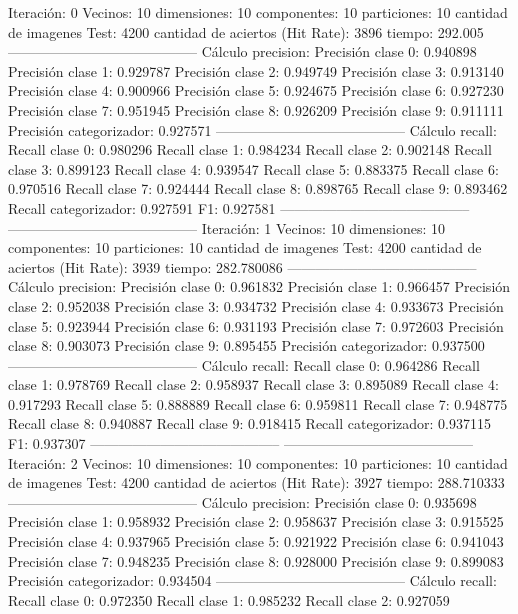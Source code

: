 Iteración: 0
Vecinos: 10
dimensiones: 10
componentes: 10
particiones: 10
cantidad de imagenes Test: 4200
cantidad de aciertos (Hit Rate): 3896
tiempo: 292.005
-----------------------------------------
Cálculo precision: 
Precisión clase 0: 0.940898
Precisión clase 1: 0.929787
Precisión clase 2: 0.949749
Precisión clase 3: 0.913140
Precisión clase 4: 0.900966
Precisión clase 5: 0.924675
Precisión clase 6: 0.927230
Precisión clase 7: 0.951945
Precisión clase 8: 0.926209
Precisión clase 9: 0.911111
Precisión categorizador: 0.927571
-----------------------------------------
Cálculo recall: 
Recall clase 0: 0.980296
Recall clase 1: 0.984234
Recall clase 2: 0.902148
Recall clase 3: 0.899123
Recall clase 4: 0.939547
Recall clase 5: 0.883375
Recall clase 6: 0.970516
Recall clase 7: 0.924444
Recall clase 8: 0.898765
Recall clase 9: 0.893462
Recall categorizador: 0.927591
F1: 0.927581
-----------------------------------------
-----------------------------------------
Iteración: 1
Vecinos: 10
dimensiones: 10
componentes: 10
particiones: 10
cantidad de imagenes Test: 4200
cantidad de aciertos (Hit Rate): 3939
tiempo: 282.780086
-----------------------------------------
Cálculo precision: 
Precisión clase 0: 0.961832
Precisión clase 1: 0.966457
Precisión clase 2: 0.952038
Precisión clase 3: 0.934732
Precisión clase 4: 0.933673
Precisión clase 5: 0.923944
Precisión clase 6: 0.931193
Precisión clase 7: 0.972603
Precisión clase 8: 0.903073
Precisión clase 9: 0.895455
Precisión categorizador: 0.937500
-----------------------------------------
Cálculo recall: 
Recall clase 0: 0.964286
Recall clase 1: 0.978769
Recall clase 2: 0.958937
Recall clase 3: 0.895089
Recall clase 4: 0.917293
Recall clase 5: 0.888889
Recall clase 6: 0.959811
Recall clase 7: 0.948775
Recall clase 8: 0.940887
Recall clase 9: 0.918415
Recall categorizador: 0.937115
F1: 0.937307
-----------------------------------------
-----------------------------------------
Iteración: 2
Vecinos: 10
dimensiones: 10
componentes: 10
particiones: 10
cantidad de imagenes Test: 4200
cantidad de aciertos (Hit Rate): 3927
tiempo: 288.710333
-----------------------------------------
Cálculo precision: 
Precisión clase 0: 0.935698
Precisión clase 1: 0.958932
Precisión clase 2: 0.958637
Precisión clase 3: 0.915525
Precisión clase 4: 0.937965
Precisión clase 5: 0.921922
Precisión clase 6: 0.941043
Precisión clase 7: 0.948235
Precisión clase 8: 0.928000
Precisión clase 9: 0.899083
Precisión categorizador: 0.934504
-----------------------------------------
Cálculo recall: 
Recall clase 0: 0.972350
Recall clase 1: 0.985232
Recall clase 2: 0.927059
